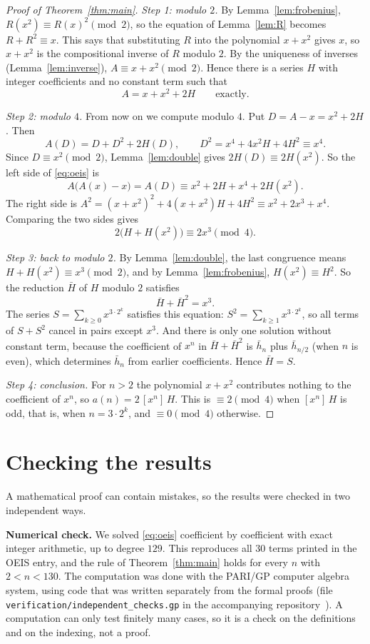 \documentclass[11pt,a4paper]{article}
\theoremstyle{definition}
\theoremstyle{remark}
\newcommand{\coeff}[2]{[x^{#1}]\,#2}
\newcommand{\para}[1]{\par\medskip\noindent\textbf{#1}\enspace}
\begin{document}
\begin{proof}[Proof of Theorem~\ref{thm:main}]
\emph{Step 1: modulo $2$.} By Lemma~\ref{lem:frobenius}, $R(x^2)\equiv R(x)^2\pmod 2$, so the equation of
Lemma~\ref{lem:R} becomes $R+R^2\equiv x$. This says that substituting $R$ into the polynomial $x+x^2$ gives $x$, so
$x+x^2$ is the compositional inverse of $R$ modulo $2$. By the uniqueness of inverses (Lemma~\ref{lem:inverse}),
$A\equiv x+x^2\pmod 2$. Hence there is a series $H$ with integer coefficients and no constant term such that
\[
A=x+x^2+2H\qquad\text{exactly.}
\]

\emph{Step 2: modulo $4$.} From now on we compute modulo $4$. Put $D=A-x=x^2+2H$. Then
\[
A(D)=D+D^2+2H(D),\qquad D^2=x^4+4x^2H+4H^2\equiv x^4 .
\]
Since $D\equiv x^2\pmod 2$, Lemma~\ref{lem:double} gives $2H(D)\equiv2H(x^2)$. So the left side of \eqref{eq:oeis} is
\[
A\bigl(A(x)-x\bigr)=A(D)\equiv x^2+2H+x^4+2H(x^2).
\]
The right side is $A^2=(x+x^2)^2+4(x+x^2)H+4H^2\equiv x^2+2x^3+x^4$. Comparing the two sides gives
\[
2\bigl(H+H(x^2)\bigr)\equiv2x^3\pmod 4 .
\]

\emph{Step 3: back to modulo $2$.} By Lemma~\ref{lem:double}, the last congruence means $H+H(x^2)\equiv x^3\pmod 2$,
and by Lemma~\ref{lem:frobenius}, $H(x^2)\equiv H^2$. So the reduction $\bar H$ of $H$ modulo $2$ satisfies
\[
\bar H+\bar H^2=x^3 .
\]
The series $S=\sum_{k\ge0}x^{3\cdot2^k}$ satisfies this equation: $S^2=\sum_{k\ge1}x^{3\cdot2^k}$, so all terms of
$S+S^2$ cancel in pairs except $x^3$. And there is only one solution without constant term, because the coefficient of
$x^n$ in $\bar H+\bar H^2$ is $\bar h_n$ plus $\bar h_{n/2}$ (when $n$ is even), which determines $\bar h_n$ from
earlier coefficients. Hence $\bar H=S$.

\emph{Step 4: conclusion.} For $n>2$ the polynomial $x+x^2$ contributes nothing to the coefficient of $x^n$, so
$a(n)=2\,\coeff{n}{H}$. This is $\equiv2\pmod 4$ when $\coeff{n}{H}$ is odd, that is, when $n=3\cdot2^k$, and
$\equiv0\pmod4$ otherwise.
\end{proof}

\section{Checking the results}\label{sec:checks}

A mathematical proof can contain mistakes, so the results were checked in two independent ways.

\para{Numerical check.}
We solved \eqref{eq:oeis} coefficient by coefficient with exact integer arithmetic, up to degree $129$. This
reproduces all 30 terms printed in the OEIS entry, and the rule of Theorem~\ref{thm:main} holds for every $n$ with
$2<n<130$.
The computation was done with the PARI/GP computer algebra system, using code that was written separately from the
formal proofs (file \texttt{verification/independent\_checks.gp} in the accompanying repository~\cite{repo}).
A computation can only test finitely many cases, so it is a check on the definitions and on the indexing, not a proof.
\end{document}
